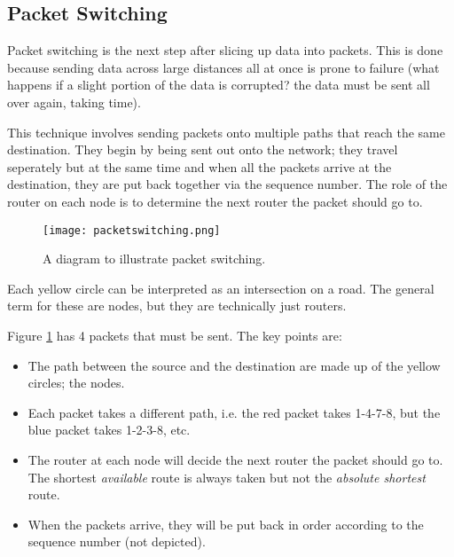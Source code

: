 \documentclass[../main.tex]{subfiles}
\begin{document}
\subsection{Packet Switching}

Packet switching is the next step after slicing up data into packets. This is done because sending data across large distances all at once is prone to failure (what happens if a slight portion of the data is corrupted? the data must be sent all over again, taking time). 

This technique involves sending packets onto multiple paths that reach the same destination. They begin by being sent out onto the network; they travel seperately but at the same time and when all the packets arrive at the destination, they are put back together via the sequence number. The role of the router on each node is to determine the next router the packet should go to. 

\begin{figure}[h]
    \centering
    \texttt{[image: packetswitching.png]}
    \caption{A diagram to illustrate packet switching.}
    \label{fig:packetswitching}
\end{figure}

Each yellow circle can be interpreted as an intersection on a road. The general term for these are nodes, but they are technically just routers.

Figure \ref{fig:packetswitching} has 4 packets that must be sent. The key points are:

\begin{itemize}
    \item The path between the source and the destination are made up of the yellow circles; the nodes.
    \item Each packet takes a different path, i.e. the red packet takes 1-4-7-8, but the blue packet takes 1-2-3-8, etc.
    \item The router at each node will decide the next router the packet should go to. The shortest \emph{available} route is always taken but not the \emph{absolute shortest} route.
    \item When the packets arrive, they will be put back in order according to the sequence number (not depicted).
\end{itemize}
\end{document}
